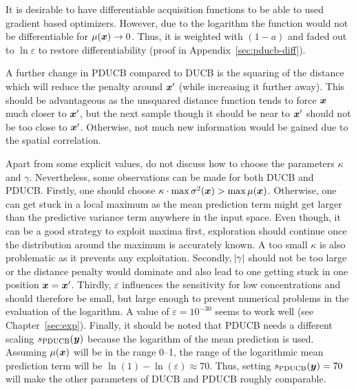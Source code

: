 It is desirable to have differentiable acquisition functions to be able to used 
gradient based optimizers. However, due to the logarithm the function would not 
be differentiable for $\mu(\bm{x}) \rightarrow 0$. Thus, it is weighted with $(1 
- a)$ and faded out to $\ln \varepsilon$ to restore differentiability (proof in 
Appendix~\ref{sec:pducb-diff}).

A further change in PDUCB compared to DUCB is the squaring of the distance which 
will reduce the penalty around $\bm{x}'$ (while increasing it further away).  
This should be advantageous as the unsquared distance function tends to force 
$\bm{x}$ much closer to $\bm{x}'$, but the next sample though it should be near to 
$\bm{x}'$ should not be too close to $\bm{x}'$.  Otherwise, not much new 
information would be gained due to the spatial correlation.

Apart from some explicit values, \textcite{Marchant:2012wb} do not discuss how 
to choose the parameters $\kappa$ and $\gamma$. Nevertheless, some observations 
can be made for both DUCB and PDUCB\@. Firstly, one should choose $\kappa \cdot 
\max \sigma^2(\bm{x}) > \max \mu(\bm{x})$. Otherwise, one can get stuck in a local 
maximum as the mean prediction term might get larger than the predictive 
variance term anywhere in the input space. Even though, it can be a good 
strategy to exploit maxima first, exploration should continue once the 
distribution around the maximum is accurately known. A too small $\kappa$ is 
also problematic as it prevents any exploitation. Secondly, $\abs{\gamma}$ 
should not be too large or the distance penalty would dominate and also lead to 
one getting stuck in one position $\bm{x} = \bm{x}'$. Thirdly, $\varepsilon$ 
influences the sensitivity for low concentrations and should therefore be small, 
but large enough to prevent numerical problems in the evaluation of the 
logarithm. A value of $\varepsilon = 10^{-30}$ seems to work well (see 
Chapter~\ref{sec:exp}). Finally, it should be noted that PDUCB needs a different 
scaling $s_{\mathrm{PDUCB}}(\bm{y})$ because the logarithm of the mean prediction is 
used. Assuming $\mu(\bm{x})$ will be in the range \numrange{0}{1}, the range of 
the logarithmic mean prediction term will be $\ln(1) - \ln(\varepsilon) \approx 
70$. Thus, setting $s_{\mathrm{PDUCB}}(\bm{y}) = 70$ will make the other parameters of 
DUCB and PDUCB roughly comparable.

